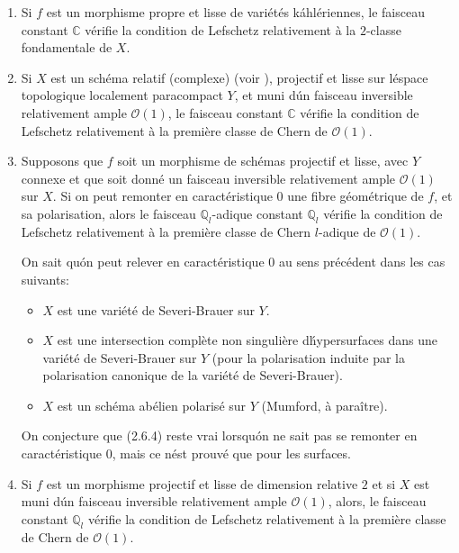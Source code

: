 \documentclass[12pt]{amsart}
\theoremstyle{plain}
\theoremstyle{remark}
\newcommand{\cO}{\mathscr{O}}
\begin{document}
\begin{enumerate}
\item[(2.6.2)] Si $f$ est un morphisme propre et lisse de vari\'et\'es k\'ahl\'eriennes, le faisceau constant $\mathbb{C}$ v\'erifie la condition de Lefschetz relativement \`a la $2$-classe fondamentale de $X$.

\item[(2.6.3)] Si $X$ est un sch\'ema relatif (complexe) (voir \cite{Hakim}), projectif et lisse sur l\'espace topologique localement paracompact $Y$, et muni d\'un faisceau inversible relativement ample $\cO(1)$, le faisceau constant $\mathbb{C}$ v\'erifie la condition de Lefschetz relativement \`a la premi\`ere classe de Chern de $\cO(1)$.

\item[(2.6.4)] Supposons que $f$ soit un morphisme de sch\'emas projectif et lisse, avec $Y$ connexe et que soit donn\'e un faisceau inversible relativement ample $\cO(1)$ sur $X$. Si on peut remonter en caract\'eristique $0$ une fibre g\'eom\'etrique de $f$, et sa polarisation, alors le faisceau $\mathbb{Q}_l$-adique constant $\mathbb{Q}_l$ v\'erifie la condition de Lefschetz relativement \`a la premi\`ere classe de Chern $l$-adique de $\cO(1)$.

On sait qu\'on peut relever en caract\'eristique $0$ au sens pr\'ec\'edent dans les cas suivants:
\begin{itemize}
\item[$-$] $X$ est une vari\'et\'e de Severi-Brauer sur $Y$.
\item[$-$] $X$ est une intersection compl\`ete non singuli\`ere d\'hypersurfaces dans une vari\'et\'e de Severi-Brauer sur $Y$ (pour la polarisation induite par la polarisation canonique de la vari\'et\'e de Severi-Brauer).
\item[$-$] $X$ est un sch\'ema ab\'elien polaris\'e sur $Y$ (Mumford, \`a para\^itre).
\end{itemize}
On conjecture que (2.6.4) reste vrai lorsqu\'on ne sait pas se remonter en caract\'eristique $0$, mais ce n\'est prouv\'e que pour les surfaces.

\item[(2.6.5)] Si $f$ est un morphisme projectif et lisse de dimension relative $2$ et si $X$ est muni d\'un faisceau inversible relativement ample $\cO(1)$, alors, le faisceau constant $\mathbb{Q}_l$ v\'erifie la condition de Lefschetz relativement \`a la premi\`ere classe de Chern de $\cO(1)$.
\end{enumerate}
\end{document}
